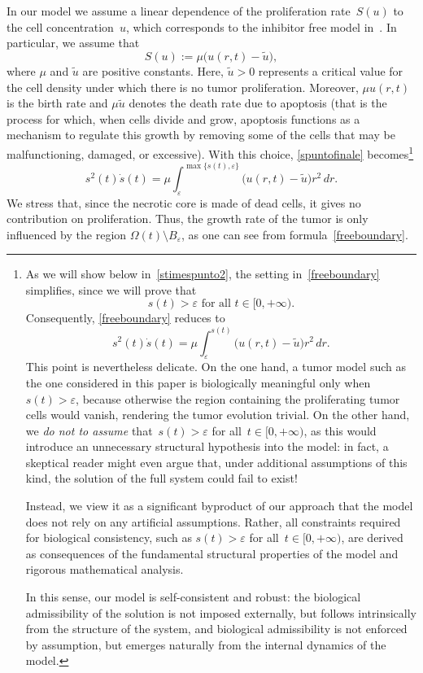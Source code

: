 \documentclass[12pt,a4paper,intlimits,sumlimits]{amsart}
\theoremstyle{definition}
\theoremstyle{plain}
\numberwithin{equation}{section}
\begin{document}
In our model we assume a linear dependence of the proliferation rate~$S(u)$ to the cell concentration~$u$, which corresponds to the inhibitor free model in~\cite{altrisigma}.
In particular, we assume that
\begin{equation}\label{PROPORZIONALE}
S(u):=\mu \big(u(r,t)-\widetilde u\big),
\end{equation}
where $\mu$ and $\widetilde u$ are positive constants.
Here, $\widetilde u>0$ represents a critical value for the cell density under which there is no tumor proliferation. Moreover, $\mu u(r, t)$ is the birth rate and $\mu \widetilde u$ denotes the death rate due to apoptosis (that is the process for which, when cells divide and grow, apoptosis functions as a mechanism to regulate this growth by removing some of the cells that may be malfunctioning, damaged, or excessive). With this choice, \eqref{spuntofinale} becomes\footnote{As we will show below \label{ATTEFOO223er} in~\eqref{stimespunto2}, the setting in~\eqref{freeboundary} simplifies, since we will prove that $${\mbox{$s(t) > \varepsilon$ for all~$t \in [0,+\infty)$.}}$$ Consequently, \eqref{freeboundary} reduces to
$$s^2(t)\dot s(t)=\mu\int_\varepsilon^{s(t)}\big(u(r,t)-\widetilde u\big)r^2\,dr. $$
This point is nevertheless delicate. On the one hand, a tumor model such as the one considered in this paper
is biologically meaningful only when $s(t) > \varepsilon$, because otherwise the region 
containing the proliferating tumor cells would vanish, rendering the tumor evolution trivial. 
On the other hand, we \emph{do not to assume} that~$s(t) > \varepsilon$ for all~$t \in [0,+\infty)$, as this would introduce an unnecessary structural hypothesis into 
the model: in fact, a skeptical reader might even argue that, under additional assumptions of this kind, 
the solution of the full system could fail to exist!

Instead, we view it as a significant byproduct of our approach that the model does not rely 
on any artificial assumptions. Rather, all constraints required for biological 
consistency, such as $s(t) > \varepsilon$ for all~$t \in [0,+\infty)$, are derived as 
consequences of the fundamental structural properties of the model and rigorous 
mathematical analysis.

In this sense, our model is self-consistent and robust: the biological admissibility of 
the solution is not imposed externally, but follows intrinsically from the structure of the system, and biological admissibility is not enforced by assumption, but emerges naturally from the internal dynamics of the model.}
\begin{equation}\label{freeboundary}
s^2(t)\dot s(t)=\mu\int_\varepsilon^{\max\{s(t),\varepsilon\}}\big(u(r,t)-\widetilde u\big)r^2\,dr.
\end{equation}
We stress that, since the necrotic core is made of dead cells, it gives no contribution on proliferation. Thus, the growth rate of the tumor is only influenced by the region $\Omega(t)\setminus B_\varepsilon$, as one can see from formula~\eqref{freeboundary}.
\end{document}
